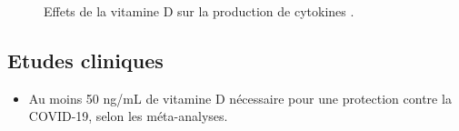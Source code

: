 \documentclass[
  a4paper,
  DIV=11,
  numbers=noendperiod,
  listof=totoc]{scrreprt}
\providecommand{\tightlist}{%
  \setlength{\itemsep}{0pt}\setlength{\parskip}{0pt}}\usepackage{longtable,booktabs,array}
\begin{document}
\begin{figure}


\caption{\label{fig-vd-dose-cytokine}Effets de la vitamine D sur la
production de cytokines \autocite{Zhang.2012}.}

\end{figure}%

\subsection{Etudes cliniques}\label{etudes-cliniques}

\begin{itemize}
\tightlist
\item
  Au moins 50 ng/mL de vitamine D nécessaire pour une protection contre
  la COVID-19, selon les méta-analyses. \autocites[
  ]{Borsche.2021}{Wimalawansa.2022}
\end{itemize}
\end{document}
